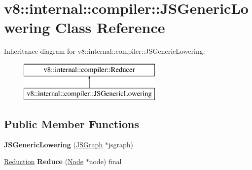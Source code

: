 \hypertarget{classv8_1_1internal_1_1compiler_1_1_j_s_generic_lowering}{}\section{v8\+:\+:internal\+:\+:compiler\+:\+:J\+S\+Generic\+Lowering Class Reference}
\label{classv8_1_1internal_1_1compiler_1_1_j_s_generic_lowering}
Inheritance diagram for v8\+:\+:internal\+:\+:compiler\+:\+:J\+S\+Generic\+Lowering\+:\begin{figure}[H]
\begin{center}
\leavevmode
\includegraphics[height=2.000000cm]{classv8_1_1internal_1_1compiler_1_1_j_s_generic_lowering}
\end{center}
\end{figure}
\subsection*{Public Member Functions}
\begin{DoxyCompactItemize}
\item 
{\bfseries J\+S\+Generic\+Lowering} (\hyperlink{classv8_1_1internal_1_1compiler_1_1_j_s_graph}{J\+S\+Graph} $\ast$jsgraph)\hypertarget{classv8_1_1internal_1_1compiler_1_1_j_s_generic_lowering_a552d4825556008510a077e0bae7ddc42}{}\label{classv8_1_1internal_1_1compiler_1_1_j_s_generic_lowering_a552d4825556008510a077e0bae7ddc42}

\item 
\hyperlink{classv8_1_1internal_1_1compiler_1_1_reduction}{Reduction} {\bfseries Reduce} (\hyperlink{classv8_1_1internal_1_1compiler_1_1_node}{Node} $\ast$node) final\hypertarget{classv8_1_1internal_1_1compiler_1_1_j_s_generic_lowering_a38f11f925a0f2e2bcea3fb61c6e6514b}{}\label{classv8_1_1internal_1_1compiler_1_1_j_s_generic_lowering_a38f11f925a0f2e2bcea3fb61c6e6514b}

\end{DoxyCompactItemize}
